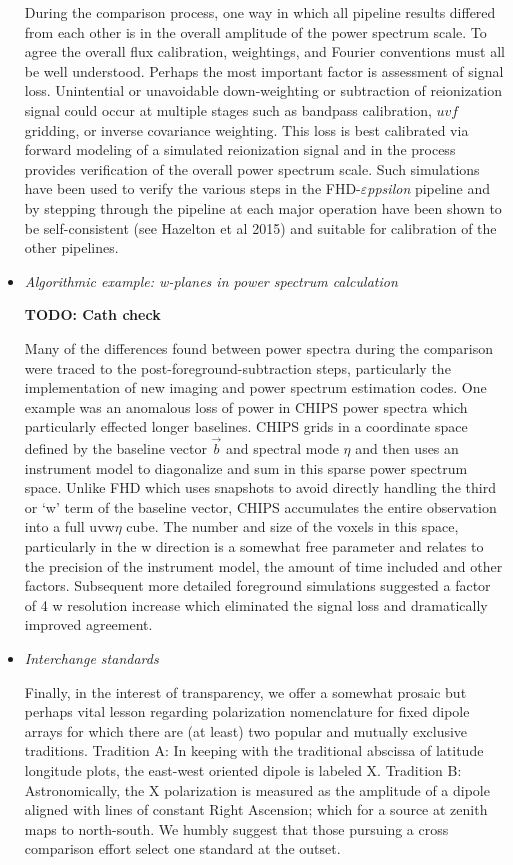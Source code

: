 \documentclass[twolcolumn,iop]{emulateapj}
\def\eppsilon{{\it $\varepsilon$ppsilon}}
\def\eppsiloncite{Hazelton et al 2015}
\begin{document}
\begin{itemize}
During the comparison process, one way in which all pipeline results differed from each other is in the overall amplitude of the power spectrum scale. To agree the overall flux calibration, weightings, and Fourier conventions must all be well understood.  Perhaps the most important factor is assessment of signal loss.  Unintential or unavoidable down-weighting or subtraction of reionization signal could occur at multiple stages such as bandpass calibration, $uvf$ gridding, or inverse covariance weighting. This loss is best calibrated via forward modeling of a simulated reionization signal and in the process provides verification of the overall power spectrum scale.  Such simulations have been used to verify the various steps in the FHD-\eppsilon{} pipeline and by stepping through the pipeline at each major operation have been shown to be self-consistent (see \eppsiloncite{}) and suitable for calibration of the other pipelines.

\item \emph{Algorithmic example: w-planes in power spectrum calculation}

\textbf{TODO: Cath check}

Many of the differences found between power spectra during the comparison were traced to the post-foreground-subtraction steps, particularly the implementation of new imaging and power spectrum estimation codes.  One example was an anomalous loss of power in CHIPS power spectra which particularly effected longer baselines.  CHIPS grids in a coordinate space defined by the baseline vector $\vec{b}$ and spectral mode $\eta$ and then uses an instrument model to diagonalize and sum in this sparse power spectrum space.  Unlike FHD which uses snapshots to avoid directly handling the third or `w' term of the baseline vector, CHIPS accumulates the entire observation into a full uvw$\eta$ cube.  The number and size of the voxels in this space, particularly in the w direction is a somewhat free parameter and relates to the precision of the instrument model, the amount of time included and other factors.  Subsequent more detailed foreground simulations suggested a factor of 4 w resolution increase which eliminated the signal loss and dramatically improved agreement.


\item \emph{Interchange standards}

Finally, in the interest of transparency, we offer a somewhat prosaic but perhaps vital lesson regarding polarization nomenclature for fixed dipole arrays for which there are (at least) two popular and mutually exclusive traditions. Tradition A: In keeping with the traditional abscissa of latitude longitude plots, the east-west oriented dipole is labeled X.  Tradition B: Astronomically, the X polarization is measured as the amplitude of a dipole aligned with lines of constant Right Ascension; which for a source at zenith maps to north-south. We humbly suggest that those pursuing a cross comparison effort select one standard at the outset. 

\end{itemize}
\end{document}
